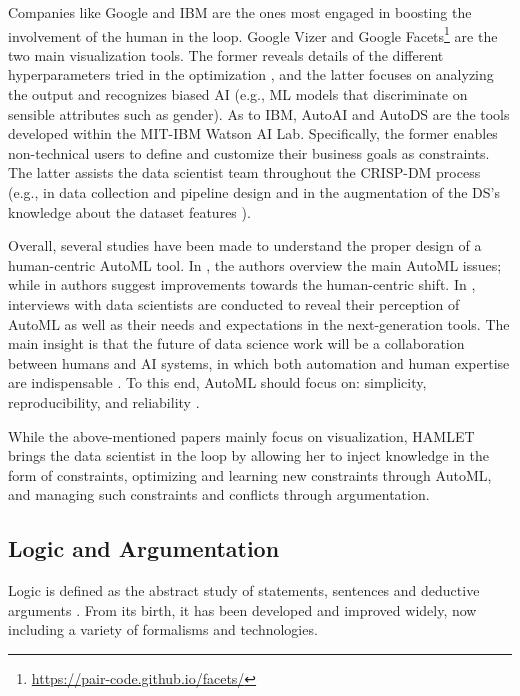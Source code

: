 Companies like Google and IBM are the ones most engaged in boosting the involvement of the human in the loop.
Google Vizer \cite{golovin2017google} and Google Facets\footnote{\url{https://pair-code.github.io/facets/}} are the two main visualization tools.
The former reveals details of the different hyperparameters tried in the optimization \cite{golovin2017google}, and the latter focuses on analyzing the output and recognizes biased AI (e.g., ML models that discriminate on sensible attributes such as gender).
As to IBM, AutoAI \cite{wang2020autoai} and AutoDS \cite{wang2021autods} are the tools developed within the MIT-IBM Watson AI Lab.
Specifically, the former enables non-technical users to define and customize their business goals as constraints. 
The latter assists the data scientist team throughout the CRISP-DM process (e.g., in data collection and pipeline design \cite{muller2019data, wang2021autods} and in the augmentation of the DS's knowledge about the dataset features \cite{drozdal2020trust}).

Overall, several studies have been made to understand the proper design of a human-centric AutoML tool.
In \cite{pfisterer2019towards}, the authors overview the main AutoML issues; while in \cite{khuat2022roles} authors suggest improvements towards the human-centric shift.
In \cite{gil2019towards, XinWLSP21automationml, crisan2021fits}, interviews with data scientists are conducted to reveal their perception of AutoML as well as their needs and expectations in the next-generation tools.
The main insight is that the future of data science work will be a collaboration between humans and AI systems, in which both automation and human expertise are indispensable \cite{wang2019human}.
To this end, AutoML should focus on: simplicity, reproducibility, and reliability \cite{XinWLSP21automationml, crisan2021fits}.

While the above-mentioned papers mainly focus on visualization, HAMLET brings the data scientist in the loop by allowing her to inject knowledge in the form of constraints, optimizing and learning new constraints through AutoML, and managing such constraints and conflicts through argumentation.

\subsection{Logic and Argumentation}\label{logic}
Logic is defined as the abstract study of statements, sentences and deductive arguments \cite{Paulson2018logichistory}.
From its birth, it has been developed and improved widely, now including a variety of formalisms and technologies.


